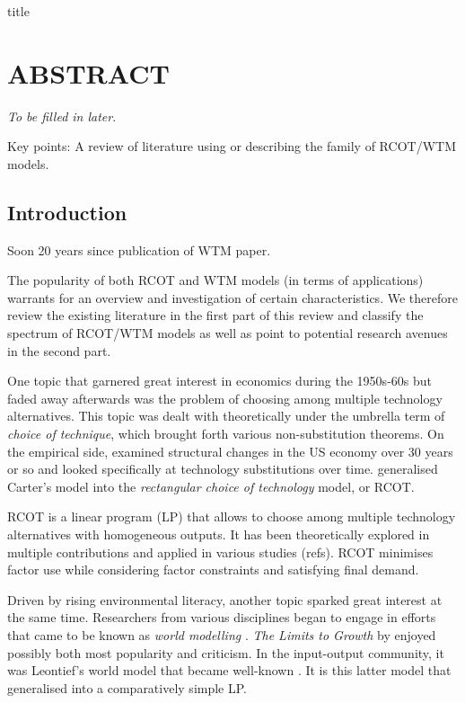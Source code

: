 \documentclass{article}
\begin{document}
{title}

\frontmatter
\tableofcontents

\mainmatter
\linenumbers

{\huge{\multiTitle}}

\section*{ABSTRACT}
\emph{To be filled in later}.

Key points: A review of literature using or describing the family of RCOT/WTM models.

\begin{refsection}

\section{Introduction}

Soon 20 years since publication of WTM paper.

The popularity of both RCOT and WTM models (in terms of applications) warrants for an overview and investigation of certain characteristics. We therefore review the existing literature in the first part of this review and classify the spectrum of RCOT/WTM models as well as point to potential research avenues in the second part.

One topic that garnered great interest in economics during the 1950s-60s but faded away afterwards was the problem of choosing among multiple technology alternatives. This topic was dealt with theoretically under the umbrella term of \textit{choice of technique}, which brought forth various non-substitution theorems. On the empirical side, \textcite{carter1970} examined structural changes in the US economy over 30 years or so and looked specifically at technology substitutions over time. \textcite{duchin_2011} generalised Carter's model into the \textit{rectangular choice of technology} model, or RCOT.

RCOT is a linear program (LP) that allows to choose among multiple technology alternatives with homogeneous outputs. It has been theoretically explored in multiple contributions \parencite{duchin_2017,steenge_2019,duchin_2012} and applied in various studies (refs). RCOT minimises factor use while considering factor constraints and satisfying final demand.

Driven by rising environmental literacy, another topic sparked great interest at the same time. Researchers from various disciplines began to engage in efforts that came to be known as \textit{world modelling} \parencite{fontela_2004}. \textit{The Limits to Growth} by \textcite{meadows_1972} enjoyed possibly both most popularity and criticism. In the input-output community, it was Leontief's world model that became well-known \parencite{leontief_1970,leontief_1977}. It is this latter model that \textcite{duchin_2005} generalised into a comparatively simple LP.


\end{refsection}
\end{document}
